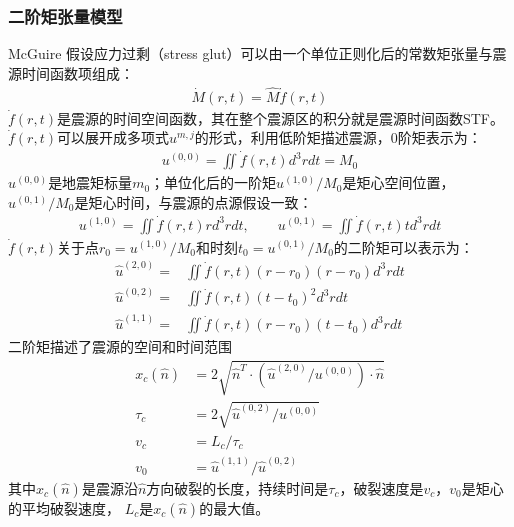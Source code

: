 \subsubsection{二阶矩张量模型}

McGuire\citep{mcguire2001teleseismic} 假设应力过剩（stress glut）可以由一个单位正则化后的常数矩张量与震源时间函数项组成：
\begin{align}
    \dot M(r,t) = \hat{M} \dot f(r,t)
  \label{equ:m-stf}
\end{align}
$\dot f(r,t)$是震源的时间空间函数，其在整个震源区的积分就是震源时间函数STF。
$\dot f(r,t)$可以展开成多项式$u^{m,j}$的形式，利用低阶矩描述震源，0阶矩表示为：
\begin{align}
    u^{(0,0)} = \iint \dot f(r,t) d^3r dt = M_0
  \label{equ:u00}
\end{align}
$u^{(0,0)}$是地震矩标量$m_0$；单位化后的一阶矩$u^{(1,0)}/M_0$是矩心空间位置，$u^{(0,1)}/M_0$是矩心时间，与震源的点源假设一致：
\begin{align}
    u^{(1,0)} = \iint \dot f(r,t) r d^3r dt,\qquad  u^{(0,1)} = \iint \dot f(r,t) t d^3r dt
  \label{equ:u10}
\end{align}
$\dot f(r,t)$关于点$r_0=u^{(1,0)}/M_0$和时刻$t_0=u^{(0,1)}/M_0$的二阶矩可以表示为：
\begin{align}
   \hat{u}^{(2,0)} = & \iint \dot f(r,t) (r-r_0)(r-r_0) d^3r dt \\
   \hat{u}^{(0,2)} = & \iint \dot f(r,t) {(t-t_0)}^2 d^3r dt \\
   \hat{u}^{(1,1)} = & \iint \dot f(r,t) (r-r_0)(t-t_0) d^3r dt 
  \label{equ:u20}
\end{align}
二阶矩描述了震源的空间和时间范围
\begin{align}
    x_c{(\hat{n})} & = 2\sqrt{ \hat{n}^T \cdot (\hat{u}^{(2,0)} /u^{(0,0)}) \cdot  \hat{n}  } \\
  \tau_c & = 2\sqrt{ \hat{u}^{(0,2)} / u^{(0,0)} } \\
  v_c & = L_c/\tau_c \\
  v_0 & = \hat{u}^{(1,1)} / \hat{u}^{(0,2)}
    \label{equ:characteristic}
\end{align}
其中$x_c{(\hat{n})}$是震源沿$\hat{n}$方向破裂的长度，持续时间是$\tau_c$，破裂速度是$v_c$，$v_0$是矩心的平均破裂速度，
$L_c$是$x_c{(\hat{n})}$的最大值。




